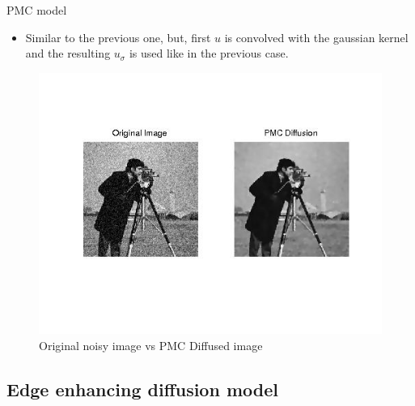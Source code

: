 \documentclass{beamer}
\begin{document}
\begin{frame}{PMC model}
    \begin{itemize}
    \item {Similar to the previous one, but, first $u$ is convolved with the gaussian kernel and the resulting  $u_{\sigma}$ is used like in the previous case.}
    \end{itemize}
\begin{figure}
\caption{Original noisy image vs PMC Diffused image}
\includegraphics[scale=0.5]{pmc.jpg}
\end{figure}
\end{frame}

\subsection{Edge enhancing diffusion model}
\end{document}

